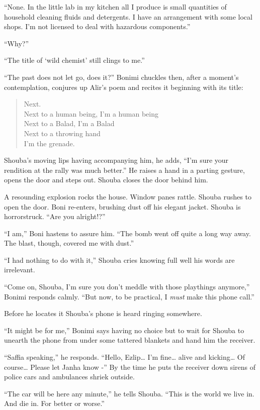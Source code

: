 \documentclass[twoside,11pt]{book}
\begin{document}
``None. In the little lab in my kitchen all I produce is small quantities of household cleaning fluids and
detergents. I have an arrangement with some local shops. I'm not licensed to deal with hazardous
components.''

``Why?''

``The title of `wild chemist' still clings to me.''

``The past does not let go, does it?'' Bonimi chuckles then, after a moment's contemplation,
conjures up Alir's poem and recites it beginning with its title:
\begin{verse}
Next. \\
Next to a human being, I'm a human being \\
Next to a Balad, I'm a Balad \\
Next to a throwing hand \\
I'm the grenade.
\end{verse}
Shouba's moving lips having accompanying him, he adds, ``I'm sure your rendition
at the rally was much better.'' He raises a hand in a parting gesture, opens the door and steps out.
Shouba closes the door behind him.

A resounding explosion rocks the house. Window panes rattle. Shouba rushes to open the door. Boni re-enters, brushing
dust off his elegant jacket. Shouba is horrorstruck. ``Are you alright!?''

``I am,'' Boni hastens to assure him. ``The bomb went off quite a long way away. The blast, though, covered
me with dust.''

``I had nothing to do with it,'' Shouba cries knowing full well his words are irrelevant.

``Come on, Shouba, I'm sure you don't meddle with those playthings anymore,'' Bonimi responds
calmly. ``But now, to be practical, I \textit{must} make this phone call.''

Before he locates it Shouba's phone is heard ringing somewhere.

``It might be for me,'' Bonimi says having no choice but to wait for Shouba to unearth the
phone from under some tattered blankets and hand him the receiver.

``Saffia speaking,'' he responds. ``Hello, Ezlip{\dots} I'm fine{\ldots} alive and
kicking{\ldots} Of course{\dots} Please let Janha know -'' By the time he puts the receiver down sirens of
police cars and ambulances shriek outside.

``The car will be here any minute,'' he tells Shouba. ``This is the world we live
in. And die in. For better or worse.''
\end{document}
